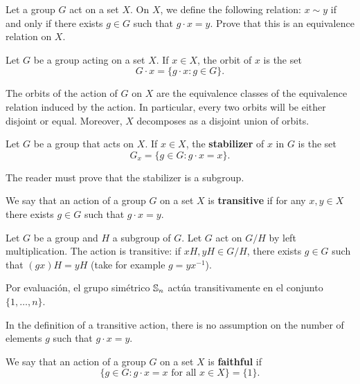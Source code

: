 \begin{exercise}
    Let a group $G$ act on a set $X$. 
    On $X$, we define the following relation: $x\sim y$ if and only if
    there exists $g\in G$ such that $g\cdot x=y$. Prove 
    that this is an equivalence relation on $X$. 
\end{exercise}

\begin{definition}
Let $G$ be a group acting on a set $X$. If $x\in X$, the
orbit of $x$ is the set
\[
G\cdot x=\{g\cdot x:g\in G\}.
\]
\end{definition}

The orbits of the action of $G$ on $X$ are 
the equivalence classes of the equivalence 
relation induced by the action. In particular, 
every two orbits will be either disjoint or equal. Moreover, 
$X$ decomposes as a disjoint union of orbits. 

\begin{definition}
        Let $G$ be a group that acts on $X$. If $x\in X$, the \textbf{stabilizer} of $x$ in $G$
        is the set   
        \[
        G_x=\{g\in G:g\cdot x=x\}.
        \]
\end{definition}

The reader must prove that the stabilizer is a subgroup. 

\begin{definition}
We say that an action of a group $G$ on a set $X$
is \textbf{transitive} if for any $x,y\in X$ there exists $g\in G$ such that $g\cdot x=y$.
\end{definition}

\begin{example}
    Let $G$ be a group and $H$ a subgroup of $G$. Let $G$ act
    on $G/H$ by left multiplication. The action is transitive: if 
    $xH,yH\in G/H$, there exists $g\in G$ such that
    $(gx)H=yH$ (take for example $g=yx^{-1}$). 
\end{example}

\begin{example}
Por evaluación,
el grupo simétrico $\mathbb{S}_n$ actúa transitivamente en el conjunto $\{1,\dots,n\}$.
\end{example}

In the definition of a transitive action, there is no assumption
on the number of elements $g$ such that $g\cdot x=y$.

\begin{definition}
We say that an action of a group $G$ on a set 
$X$ is \textbf{faithful} if 
\[
\{g\in G:g\cdot x=x\text{ for all $x\in X$}\}=\{1\}.
\]
\end{definition}

